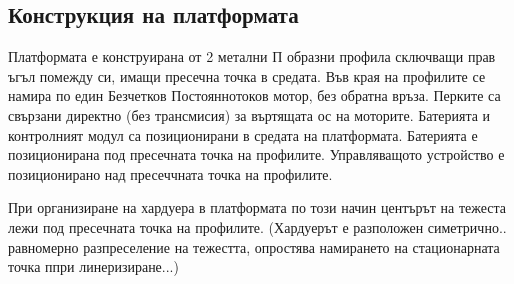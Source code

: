\subsection{Конструкция на платформата}

Платформата е конструирана от 2 метални П образни профила сключващи прав ъгъл помежду си, имащи пресечна точка в средата.
Във края на профилите се намира по един Безчетков Постояннотоков мотор, без обратна връза.
Перките са свързани директно (без трансмисия) за въртящата ос на моторите.
Батерията и контролният модул са позиционирани в средата на платформата. 
Батерията е позиционирана под пресечната точка на профилите.
Управляващото устройство е позиционирано над пресеччната точка на профилите.

При организиране на хардуера в платформата по този начин центърът на тежеста лежи под пресечната точка на профилите. (Хардуерът е разположен симетрично.. равномерно разпреселение на тежестта, опростява намирането на стационарната точка ппри линеризиране...)


